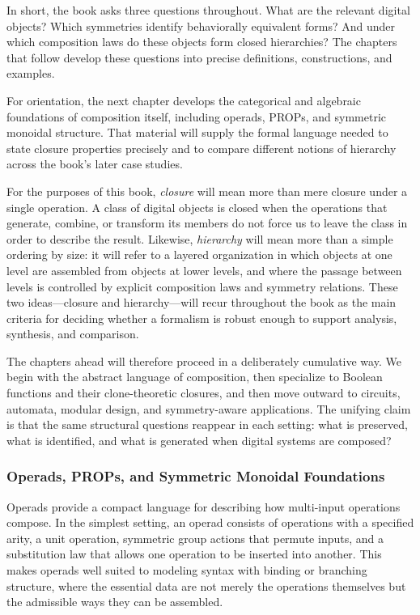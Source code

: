 \documentclass[11pt]{article}
\begin{document}
In short, the book asks three questions throughout. What are the relevant digital objects? Which symmetries identify behaviorally equivalent forms? And under which composition laws do these objects form closed hierarchies? The chapters that follow develop these questions into precise definitions, constructions, and examples.

For orientation, the next chapter develops the categorical and algebraic foundations of composition itself, including operads, PROPs, and symmetric monoidal structure. That material will supply the formal language needed to state closure properties precisely and to compare different notions of hierarchy across the book's later case studies.

For the purposes of this book, \emph{closure} will mean more than mere closure under a single operation. A class of digital objects is closed when the operations that generate, combine, or transform its members do not force us to leave the class in order to describe the result. Likewise, \emph{hierarchy} will mean more than a simple ordering by size: it will refer to a layered organization in which objects at one level are assembled from objects at lower levels, and where the passage between levels is controlled by explicit composition laws and symmetry relations. These two ideas---closure and hierarchy---will recur throughout the book as the main criteria for deciding whether a formalism is robust enough to support analysis, synthesis, and comparison.

The chapters ahead will therefore proceed in a deliberately cumulative way. We begin with the abstract language of composition, then specialize to Boolean functions and their clone-theoretic closures, and then move outward to circuits, automata, modular design, and symmetry-aware applications. The unifying claim is that the same structural questions reappear in each setting: what is preserved, what is identified, and what is generated when digital systems are composed?


\subsubsection{Operads, PROPs, and Symmetric Monoidal Foundations}

Operads provide a compact language for describing how multi-input operations compose. In the simplest setting, an operad consists of operations with a specified arity, a unit operation, symmetric group actions that permute inputs, and a substitution law that allows one operation to be inserted into another. This makes operads well suited to modeling syntax with binding or branching structure, where the essential data are not merely the operations themselves but the admissible ways they can be assembled.
\end{document}

